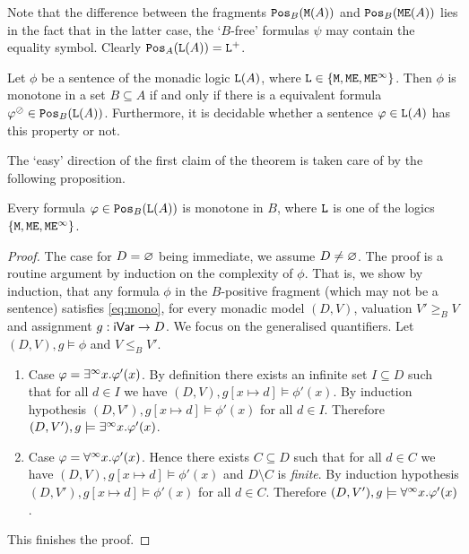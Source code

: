 Note that the difference between the fragments $\monot{\ofo(A)}{B}$ and 
$\monot{\ofoe(A)}{B}$ lies in the fact that in the latter case, the `$B$-free'
formulas $\psi$ may contain the equality symbol. 
Clearly $\monot{\llang(A)}{A}= \llang^+$.

\begin{theorem}
\label{t:mono}
Let $\phi$ be a sentence of the monadic logic $\llang(A)$, where $\llang \in 
\{ \ofo, \ofoe, \ofoei \}$.
Then $\phi$ is monotone in a set $B \subseteq A$ if and only if there is a 
equivalent formula $\phi^{\tmono} \in \monot{\llang(A)}{B}$.
Furthermore, it is decidable whether a sentence $\phi \in \llang(A)$ has this 
property or not.
\end{theorem}

The `easy' direction of the first claim of the theorem is taken care of by the following 
proposition.

\begin{proposition}
\label{p:monoismonot}
Every formula $\phi \in \monot{\llang(A)}{B}$ is monotone in $B$,
where $\llang$ is one of the logics $\{ \ofo, \ofoe, \ofoei \}$.
\end{proposition}

\begin{proof} 
The case for $D= \nada$ being immediate, we assume $D \neq \nada$.
The proof is a routine argument by induction on the complexity of $\phi$.
That is, we show by induction, that any formula $\phi$ in the $B$-positive
fragment (which may not be a sentence) satisfies \eqref{eq:mono}, for every 
monadic model $(D,V)$, valuation $V' \geq_{B} V$ and assignment ${g:\fovar\to 
D}$.
We focus on the generalised quantifiers. 
Let $(D,V),g \models \phi$ and
$V \leq_{B} V'$.
%
\begin{enumerate}[\textbullet]
\item
Case $\phi = \qu x.\phi'(x)$. By definition there exists an infinite set
$I\subseteq D$ such that for all $d\in I$ we have $(D,V),g[x\mapsto d] \models 
\phi'(x)$. 
By induction hypothesis $(D,V'),g[x\mapsto d] \models\phi'(x)$ 
for all $d \in I$. Therefore $(D,V'),g \models \qu x.\phi'(x)$.

\item Case $\phi = \dqu x.\phi'(x)$. 
Hence there exists $C\subseteq D$ such that for all $d\in C$ we have 
$(D,V),g[x\mapsto d] \models \phi'(x)$ and $D\setminus C$ is \emph{finite}. 
By induction hypothesis $(D,V'),g[x\mapsto d] \models \phi'(x)$ for all $d 
\in C$. 
Therefore $(D,V'),g \models \dqu x.\phi'(x)$.
\end{enumerate}
%
This finishes the proof.
\end{proof}

